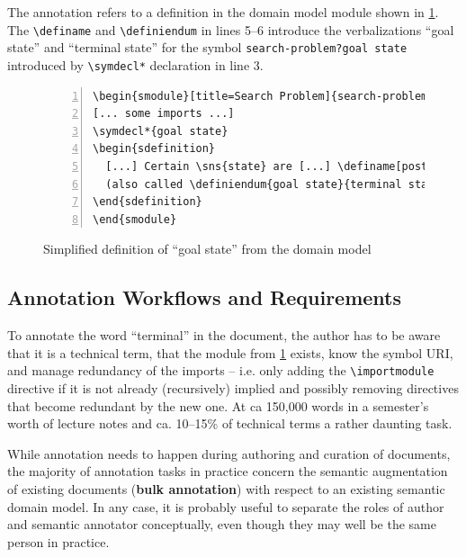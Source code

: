 \documentclass[runningheads]{llncs}
\begin{document}
The annotation refers to a definition in the domain model module shown in
\cref{fig:state-space}.  The \lstinline|\definame| and \lstinline|\definiendum| in lines
5--6 introduce the verbalizations ``goal state'' and ``terminal state'' for the symbol
\lstinline|search-problem?goal state| introduced by \lstinline|\symdecl*| declaration in
line 3.

\begin{figure}[ht]\centering
\begin{lstlisting}[morekeywords={definame,symdecl,definiendum},numbers=left,
escapechar=!]
\begin{smodule}[title=Search Problem]{search-problem}
[... some imports ...]
\symdecl*{goal state}
\begin{sdefinition}
  [...] Certain \sns{state} are [...] \definame[post=s]{goal state} [...]
  (also called \definiendum{goal state}{terminal states}).
\end{sdefinition}
\end{smodule}
\end{lstlisting}
  \caption{Simplified definition of ``goal state'' from the domain model}\label{fig:state-space}
\end{figure}

\subsection{Annotation Workflows and Requirements}\label{sec:workflows}

To annotate the word ``terminal'' in the document, the author has to be aware that it is a
technical term, that the module from \cref{fig:state-space} exists, know the symbol URI,
and manage redundancy of the imports -- i.e. only adding the \lstinline|\importmodule|
directive if it is not already (recursively) implied and possibly removing directives that
become redundant by the new one.  At ca 150,000 words in a semester's worth of lecture
notes and ca. 10--15\% of technical terms a rather daunting task.

While annotation needs to happen during authoring and curation of documents, the majority
of annotation tasks in practice concern the semantic augmentation of existing documents
(\textbf{bulk annotation}) with respect to an existing semantic domain model. In any case,
it is probably useful to separate the roles of author and semantic annotator conceptually,
even though they may well be the same person in practice.
\end{document}
